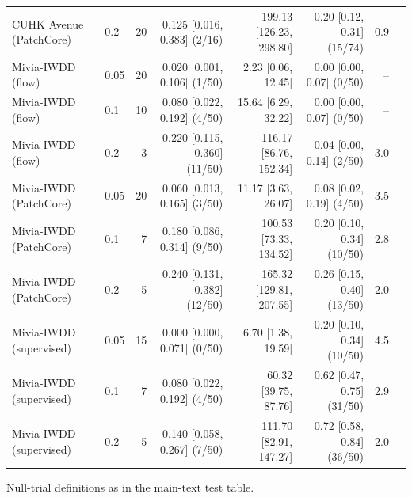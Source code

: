 \begin{table}[t]
{\begin{tabular}{llrrrrrr}
CUHK Avenue (PatchCore) & 0.2 & 20 & 0.125 [0.016, 0.383] (2/16) & 199.13 [126.23, 298.80] & 0.20 [0.12, 0.31] (15/74) & 0.9 \\
Mivia-IWDD (flow) & 0.05 & 20 & 0.020 [0.001, 0.106] (1/50) & 2.23 [0.06, 12.45] & 0.00 [0.00, 0.07] (0/50) & -- \\
Mivia-IWDD (flow) & 0.1 & 10 & 0.080 [0.022, 0.192] (4/50) & 15.64 [6.29, 32.22] & 0.00 [0.00, 0.07] (0/50) & -- \\
Mivia-IWDD (flow) & 0.2 & 3 & 0.220 [0.115, 0.360] (11/50) & 116.17 [86.76, 152.34] & 0.04 [0.00, 0.14] (2/50) & 3.0 \\
Mivia-IWDD (PatchCore) & 0.05 & 20 & 0.060 [0.013, 0.165] (3/50) & 11.17 [3.63, 26.07] & 0.08 [0.02, 0.19] (4/50) & 3.5 \\
Mivia-IWDD (PatchCore) & 0.1 & 7 & 0.180 [0.086, 0.314] (9/50) & 100.53 [73.33, 134.52] & 0.20 [0.10, 0.34] (10/50) & 2.8 \\
Mivia-IWDD (PatchCore) & 0.2 & 5 & 0.240 [0.131, 0.382] (12/50) & 165.32 [129.81, 207.55] & 0.26 [0.15, 0.40] (13/50) & 2.0 \\
Mivia-IWDD (supervised) & 0.05 & 15 & 0.000 [0.000, 0.071] (0/50) & 6.70 [1.38, 19.59] & 0.20 [0.10, 0.34] (10/50) & 4.5 \\
Mivia-IWDD (supervised) & 0.1 & 7 & 0.080 [0.022, 0.192] (4/50) & 60.32 [39.75, 87.76] & 0.62 [0.47, 0.75] (31/50) & 2.9 \\
Mivia-IWDD (supervised) & 0.2 & 5 & 0.140 [0.058, 0.267] (7/50) & 111.70 [82.91, 147.27] & 0.72 [0.58, 0.84] (36/50) & 2.0 \\
\bottomrule
\end{tabular}}
\begin{minipage}{\linewidth}\vspace{2pt}\footnotesize Null-trial definitions as in the main-text test table.\end{minipage}
\end{table}
